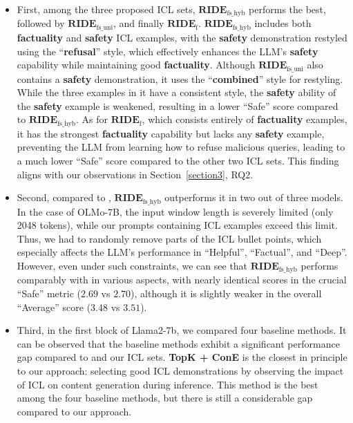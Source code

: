 \begin{itemize}

 \item First, among the three proposed ICL sets, $\textbf{RIDE}_{\text{fs\_hyb}}$ performs the best, followed by $\textbf{RIDE}_{\text{fs\_uni}}$, and finally $\textbf{RIDE}_{\text{f}}$. $\textbf{RIDE}_{\text{fs\_hyb}}$ includes both \textbf{\color{myblue} factuality} and \textbf{\color{myred} safety} ICL examples, with the \textbf{\color{myred} safety} demonstration restyled using the ``\textbf{refusal}'' style, which effectively enhances the LLM’s \textbf{\color{myred} safety} capability while maintaining good \textbf{\color{myblue} factuality}. 
Although $\textbf{RIDE}_{\text{fs\_uni}}$ also contains a \textbf{\color{myred} safety} demonstration, it uses the ``\textbf{combined}'' style for restyling. 
While the three examples in it have a consistent style, the \textbf{\color{myred} safety} ability of the \textbf{\color{myred} safety} example is weakened, resulting in a lower ``Safe'' score compared to $\textbf{RIDE}_{\text{fs\_hyb}}$. 
As for $\textbf{RIDE}_{\text{f}}$, which consists entirely of \textbf{\color{myblue} factuality} examples, it has the strongest \textbf{\color{myblue} factuality} capability but lacks any \textbf{\color{myred} safety} example, preventing the LLM from learning how to refuse malicious queries, leading to a much lower ``Safe'' score compared to the other two ICL sets.
This finding aligns with our observations in Section~\ref{section3}, RQ2.

 \item Second, compared to \methodname{}, $\textbf{RIDE}_{\text{fs\_hyb}}$ outperforms it in two out of three models. 
In the case of OLMo-7B, the input window length is severely limited (only 2048 tokens), while our prompts containing ICL examples exceed this limit. 
Thus, we had to randomly remove parts of the ICL bullet points, which especially affects the LLM’s performance in ``Helpful'', ``Factual'', and ``Deep''.
However, even under such constraints, we can see that $\textbf{RIDE}_{\text{fs\_hyb}}$ performs comparably with \methodname{} in various aspects, with nearly identical scores in the crucial ``Safe'' metric ($2.69$ vs $2.70$), although it is slightly weaker in the overall ``Average'' score ($3.48$ vs $3.51$).

 \item Third, in the first block of Llama2-7b, we compared four baseline methods.
It can be observed that the baseline methods exhibit a significant performance gap compared to \methodname{} and our ICL sets. 
\textbf{TopK + ConE} is the closest in principle to our approach: selecting good ICL demonstrations by observing the impact of ICL on content generation during inference. 
This method is the best among the four baseline methods, but there is still a considerable gap compared to our approach. 


\end{itemize}
